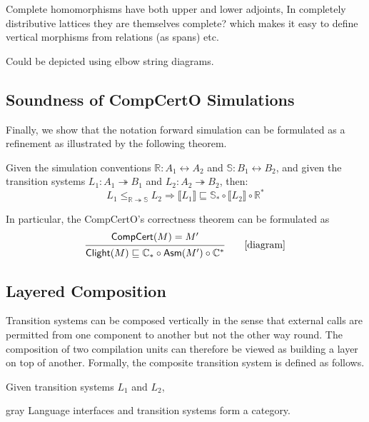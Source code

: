 \documentclass[sigplan,10pt,review,anonymous]{acmart}
\newcommand{\kw}[1]{\ensuremath{ \mathsf{#1} }}
\begin{document}
Complete homomorphisms have both upper and lower adjoints,
In completely distributive lattices
they are themselves complete?
which makes it easy to define vertical morphisms
from relations (as spans) etc.

Could be depicted using elbow string diagrams.




\subsection{Soundness of CompCertO Simulations}

Finally, we show that the notation forward simulation can be formulated as a
refinement as illustrated by the following theorem.
\begin{theorem}
  Given the simulation conventions $\mathbb{R} : A_1 \leftrightarrow A_2$ and
  $\mathbb{S} : B_1 \leftrightarrow B_2$, and given the transition systems
  $L_1: A_1 \twoheadrightarrow B_1$ and
  $L_2: A_2 \twoheadrightarrow B_2$, then:
  \[
    L_1 \le_{\mathbb{R} \twoheadrightarrow \mathbb{S}} L_2 \Rightarrow
    \llbracket L_1 \rrbracket \sqsubseteq
    \mathbb{S}_* \circ \llbracket L_2 \rrbracket \circ \mathbb{R}^*
  \]
\end{theorem}

In particular, the CompCertO's correctness theorem can be formulated as
\[
  \begin{prooftree}
    \hypo{\kw{CompCert}(M) = M'}
    \infer1{
      \kw{Clight}(M)
      \sqsubseteq
      \mathbb{C}_*\circ \kw{Asm}(M') \circ \mathbb{C}^*}
  \end{prooftree}
  \qquad
  \mbox{[diagram]}
\]

\subsection{Layered Composition}

Transition systems can be composed vertically in the sense that external calls
are permitted from one component to another but not the other way round. The
composition of two compilation units can therefore be viewed as building a layer
on top of another. Formally, the composite transition system is defined as
follows.

\begin{definition}
  Given transition systems $L_1$ and $L_2$,
\end{definition}

\begin{color}{gray}
  Language interfaces and transition systems form a category.
\end{color}
\end{document}
